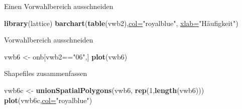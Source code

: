\documentclass[ignorenonframetext,]{beamer}
\newenvironment{Shaded}{\begin{snugshade}}{\end{snugshade}}
\newcommand{\KeywordTok}[1]{\textcolor[rgb]{0.26,0.66,0.93}{\textbf{#1}}}
\newcommand{\DataTypeTok}[1]{\textcolor[rgb]{0.74,0.68,0.62}{\underline{#1}}}
\newcommand{\DecValTok}[1]{\textcolor[rgb]{0.27,0.67,0.26}{#1}}
\newcommand{\StringTok}[1]{\textcolor[rgb]{0.02,0.61,0.04}{#1}}
\newcommand{\OperatorTok}[1]{\textcolor[rgb]{0.74,0.68,0.62}{#1}}
\newcommand{\NormalTok}[1]{\textcolor[rgb]{0.74,0.68,0.62}{#1}}
\begin{document}
\begin{frame}[fragile]{Einen Vorwahlbereich ausschneiden}

\begin{Shaded}
\end{Shaded}

\begin{Shaded}
\begin{Highlighting}[]
\KeywordTok{library}\NormalTok{(lattice)}
\KeywordTok{barchart}\NormalTok{(}\KeywordTok{table}\NormalTok{(vwb2),}\DataTypeTok{col=}\StringTok{"royalblue"}\NormalTok{,}
         \DataTypeTok{xlab=}\StringTok{"Häufigkeit"}\NormalTok{)}
\end{Highlighting}
\end{Shaded}

\end{frame}

\begin{frame}[fragile]{Vorwahlbereich ausschneiden}

\begin{Shaded}
\begin{Highlighting}[]
\NormalTok{vwb6 <-}\StringTok{ }\NormalTok{onb[vwb2}\OperatorTok{==}\StringTok{"06"}\NormalTok{,]}
\KeywordTok{plot}\NormalTok{(vwb6)}
\end{Highlighting}
\end{Shaded}

\end{frame}

\begin{frame}[fragile]{Shapefiles zusammenfassen}

\begin{Shaded}
\begin{Highlighting}[]
\NormalTok{vwb6c <-}\StringTok{ }\KeywordTok{unionSpatialPolygons}\NormalTok{(vwb6,}
              \KeywordTok{rep}\NormalTok{(}\DecValTok{1}\NormalTok{,}\KeywordTok{length}\NormalTok{(vwb6)))}
\KeywordTok{plot}\NormalTok{(vwb6c,}\DataTypeTok{col=}\StringTok{"royalblue"}\NormalTok{)}
\end{Highlighting}
\end{Shaded}

\end{frame}
\end{document}
